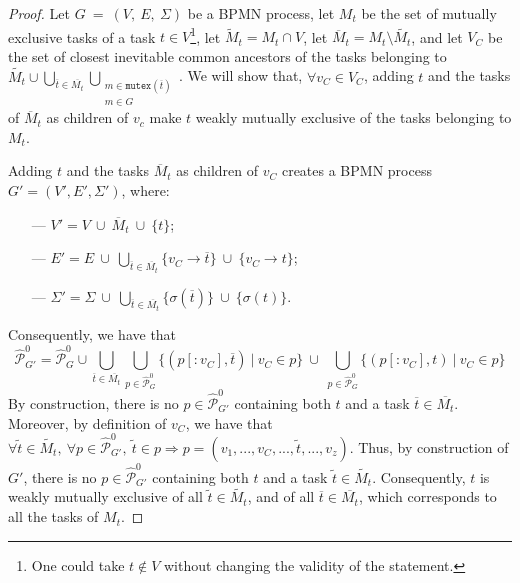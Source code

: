 \documentclass{article}
\newcommand{\bpmnacyclicpaths}[1]{\mathcal{\widehat{P}}_{#1}^{0}}
\newcommand{\graph}{G~=~(V,~E,~\Sigma)}
\newcommand{\mutexesof}[1]{\ensuremath{\mathtt{mutex}(#1)}}
\begin{document}
	\begin{proof}
		Let $\graph$ be a BPMN process, let $M_t$ be the set of mutually exclusive tasks of a task $t \in V$\footnote{One could take $t \notin V$ without changing the validity of the statement.}, let $\tilde{M}_t = M_t \cap V$, let $\overline{M}_t = M_t \setminus \tilde{M_t}$, and let $V_C$ be the set of closest inevitable common ancestors of the tasks belonging to $\tilde{M_t} \cup \bigcup\limits_{\overline{t} \in \overline{M_t}} \bigcup\limits_{\substack{m \in \mutexesof{\overline{t}} \\ m \in G}}$.
		We will show that, $\forall v_C \in V_C$, adding $t$ and the tasks of $\overline{M}_t$ as children of $v_c$ make $t$ weakly mutually exclusive of the tasks belonging to $M_t$.
		
		Adding $t$ and the tasks $\overline{M}_t$ as children of $v_C$ creates a BPMN process $G' = (V', E', \Sigma')$, where:
		\begin{itemize}
			\setlength\itemsep{-0.5em}
			\item[---] $V' = V\ \cup\ \overline{M}_t\ \cup\ \{t\}$;
			\item[---] $E' = E\ \cup\ \bigcup\limits_{\overline{t} \in \overline{M_t}} \{v_C \rightarrow \overline{t}\}\ \cup\ \{v_C \rightarrow t\}$;
			\item[---] $\Sigma' = \Sigma\ \cup\ \bigcup\limits_{\overline{t} \in \overline{M_t}} \{\sigma(\overline{t})\}\ \cup\ \{\sigma(t)\}$.
		\end{itemize}
		
		Consequently, we have that
		\begin{equation*}
			\bpmnacyclicpaths{G'} = \bpmnacyclicpaths{G} \cup \bigcup\limits_{\overline{t} \in \overline{M_t}} \bigcup\limits_{p \in \bpmnacyclicpaths{G}} \{(p[:v_C], \overline{t})\ \vert\ v_C \in p\}\ \cup\ \bigcup\limits_{p \in \bpmnacyclicpaths{G}} \{(p[:v_C], t)\ \vert\ v_C \in p\}
		\end{equation*}
		By construction, there is no $p \in \bpmnacyclicpaths{G'}$ containing both $t$ and a task $\overline{t} \in \overline{M_t}$.
		Moreover, by definition of $v_C$, we have that $\forall \tilde{t} \in \tilde{M_t},\ \forall p \in \bpmnacyclicpaths{G'},\ \tilde{t} \in p \Rightarrow p = (v_1, ..., v_C, ..., \tilde{t}, ..., v_z)$.
		Thus, by construction of $G'$, there is no $p \in \bpmnacyclicpaths{G'}$ containing both $t$ and a task $\tilde{t} \in \tilde{M_t}$.
		Consequently, $t$ is weakly mutually exclusive of all $\tilde{t} \in \tilde{M_t}$, and of all $\overline{t} \in \overline{M_t}$, which corresponds to all the tasks of $M_t$.
	\end{proof}
	
\end{document}
